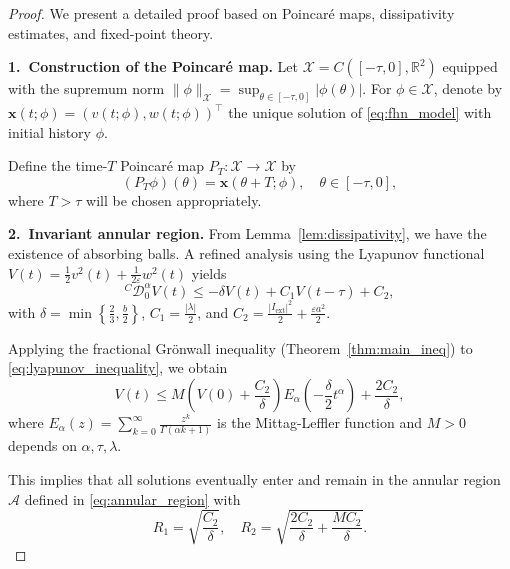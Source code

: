 \documentclass[10pt,a4paper]{amsart}
\begin{document}
\begin{proof}
	We present a detailed proof based on Poincaré maps, dissipativity estimates, and fixed-point theory.
	
	\noindent\textbf{1.~Construction of the Poincaré map.}
	Let $\mathcal{X} = C([-\tau,0], \mathbb{R}^2)$ equipped with the supremum norm $\|\phi\|_{\mathcal{X}} = \sup_{\theta \in [-\tau,0]} |\phi(\theta)|$. 
	For $\phi \in \mathcal{X}$, denote by $\mathbf{x}(t;\phi) = (v(t;\phi), w(t;\phi))^\top$ the unique solution of \eqref{eq:fhn_model} with initial history $\phi$.
	
	Define the time-$T$ Poincaré map $P_T: \mathcal{X} \to \mathcal{X}$ by
	\begin{equation}
		(P_T\phi)(\theta) = \mathbf{x}(\theta + T; \phi), \quad \theta \in [-\tau, 0],
		\label{eq:poincare_map_T}
	\end{equation}
	where $T > \tau$ will be chosen appropriately.
	
	\noindent\textbf{2.~Invariant annular region.}
	From Lemma~\ref{lem:dissipativity}, we have the existence of absorbing balls. 
	A refined analysis using the Lyapunov functional $V(t) = \frac{1}{2}v^2(t) + \frac{1}{2\varepsilon}w^2(t)$ yields
	\begin{equation}
		^{C}\mathcal{D}_0^\alpha V(t) \leq -\delta V(t) + C_1 V(t-\tau) + C_2,
		\label{eq:lyapunov_inequality}
	\end{equation}
	with $\delta = \min\left\{\frac{2}{3}, \frac{b}{2}\right\}$, $C_1 = \frac{|\lambda|}{2}$, and $C_2 = \frac{|I_{\text{ext}}|^2}{2} + \frac{\varepsilon a^2}{2}$.
	
	Applying the fractional Grönwall inequality (Theorem~\ref{thm:main_ineq}) to \eqref{eq:lyapunov_inequality}, we obtain
	\begin{equation}
		V(t) \leq M\left(V(0) + \frac{C_2}{\delta}\right) E_\alpha\left(-\frac{\delta}{2} t^\alpha\right) + \frac{2C_2}{\delta},
		\label{eq:lyapunov_bound}
	\end{equation}
	where $E_\alpha(z) = \sum_{k=0}^\infty \frac{z^k}{\Gamma(\alpha k + 1)}$ is the Mittag-Leffler function and $M > 0$ depends on $\alpha, \tau, \lambda$.
	
	This implies that all solutions eventually enter and remain in the annular region $\mathcal{A}$ defined in \eqref{eq:annular_region} with
	\begin{equation}
		R_1 = \sqrt{\frac{C_2}{\delta}}, \quad R_2 = \sqrt{\frac{2C_2}{\delta} + \frac{M C_2}{\delta}}.
		\label{eq:radius_bounds}
	\end{equation}
	

\end{proof}
\end{document}

